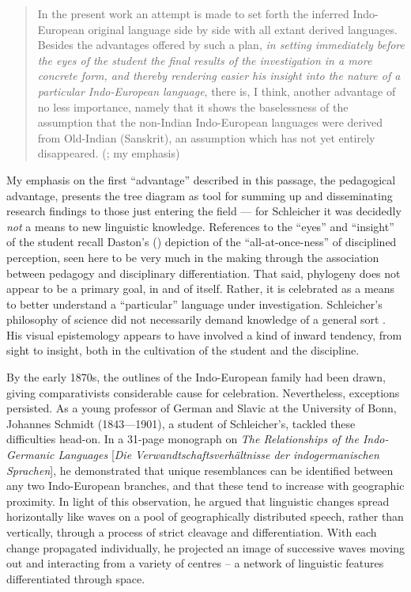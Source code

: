 \documentclass[output=paper]{langscibook}
\begin{document}
\begin{quotation}
\largerpage[1]In the present work an attempt is made to set forth the inferred Indo-European original language side by side with all extant derived languages. Besides the advantages offered by such a plan, \emph{in setting immediately before the eyes of the student the final results of the investigation in a more concrete form, and thereby rendering easier his insight into the nature of a particular Indo-European language}, there is, I think, another advantage of no less importance, namely that it shows the baselessness of the assumption that the non-Indian Indo-European languages were derived from Old-Indian (Sanskrit), an assumption which has not yet entirely disappeared. (\citealt[94]{Schleicher196718612}; my emphasis)
\end{quotation}

My emphasis on the first ``advantage'' described in this passage, the pedagogical advantage, presents the tree diagram as tool for summing up and disseminating research findings to those just entering the field — for Schleicher it was decidedly \emph{not} a means to new linguistic knowledge. References to the ``eyes'' and ``insight'' of the student recall Daston's (\citeyear{Daston2008}) depiction of the ``all-at-once-ness'' of disciplined perception, seen here to be very much in the making through the association between pedagogy and disciplinary differentiation. That said, phylogeny does not appear to be a primary goal, in and of itself. Rather, it is celebrated as a means to better understand a ``particular'' language under investigation. Schleicher's philosophy of science did not necessarily demand knowledge of a general sort \citep{Nyhart2012}. His visual epistemology appears to have involved a kind of inward tendency, from sight to insight, both in the cultivation of the student and the discipline.

By the early 1870s, the outlines of the Indo-European family had been drawn, giving comparativists considerable cause for celebration. Nevertheless, exceptions persisted. As a young professor of German and Slavic at the University of Bonn, Johannes Schmidt (1843—1901), a student of Schleicher's, tackled these difficulties head-on. In a 31-page monograph on \emph{The Relationships of the Indo-Germanic Languages} [\emph{Die Verwandtschaftsverhältnisse der indo\-ger\-manischen Spra\-chen}], he demonstrated that unique resemblances can be identified between any two Indo-European branches, and that these tend to increase with geographic proximity. In light of this observation, he argued that linguistic changes spread horizontally like waves on a pool of geographically distributed speech, rather than vertically, through a process of strict cleavage and differentiation. With each change propagated individually, he projected an image of successive waves moving out and interacting from a variety of centres -- a network of linguistic features differentiated through space.
\end{document}
